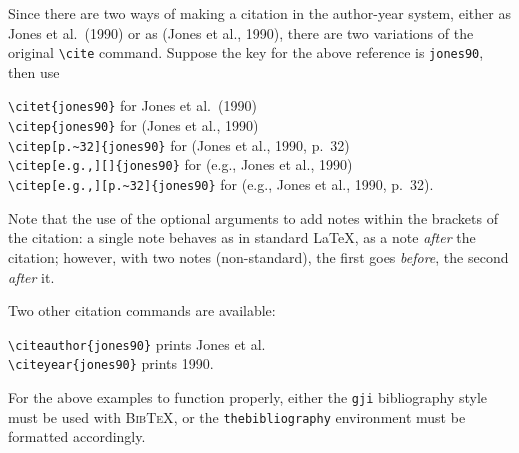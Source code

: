 \documentclass[extra,mreferee]{gji}
\newcommand{\btx}{\textsc{BibTeX}}
\begin{document}
Since there are two ways of making a citation in the author-year system,
either as Jones et al.\ (1990) or as (Jones et al., 1990), there
are two variations of the original \verb!\cite! command.
Suppose the key for the above reference is \texttt{jones90}, then use
\begin{flushleft}
\verb!\citet{jones90}! for Jones et al.\ (1990)\\
\verb!\citep{jones90}! for (Jones et al., 1990)\\
\verb!\citep[p.~32]{jones90}! for (Jones et al., 1990, p.~32)\\
\verb!\citep[e.g.,][]{jones90}! for (e.g., Jones et al., 1990)\\
\verb!\citep[e.g.,][p.~32]{jones90}! for (e.g., Jones et al., 1990, p.~32).

\end{flushleft}
Note that the use of the optional arguments to add notes within the
brackets of the citation:
a single note behaves as in standard \LaTeX, as a note
\emph{after} the citation; however, with two notes (non-standard), the
first goes \emph{before}, the second \emph{after} it.

Two other citation commands are available:
\begin{flushleft}
\verb!\citeauthor{jones90}! prints Jones et al.\\
\verb!\citeyear{jones90}! prints 1990.
\end{flushleft}

For the above examples to function properly, either the \verb"gji"
bibliography style must be used with \btx, or the
\texttt{thebibliography} environment must be formatted accordingly.

\begin{flushleft}
With \btx\\[1ex]
\verb!!\\
\verb!\verb!}!\\[1ex]
Without \btx\\[0.5ex]
\begin{verbatim}
\begin{thebibliography}{}
\bibitem[Jones et al.(1990)]{jones90}
  Jones, J. K., Thomas, P. R.
  \& Peters, R. F., 1990.
  The best results of fitting curves.
  \textit{J. Math. Dev.}, \textbf{12}, 1245--1261.
\end{thebibliography}
\end{verbatim}
\end{flushleft}
\end{document}
